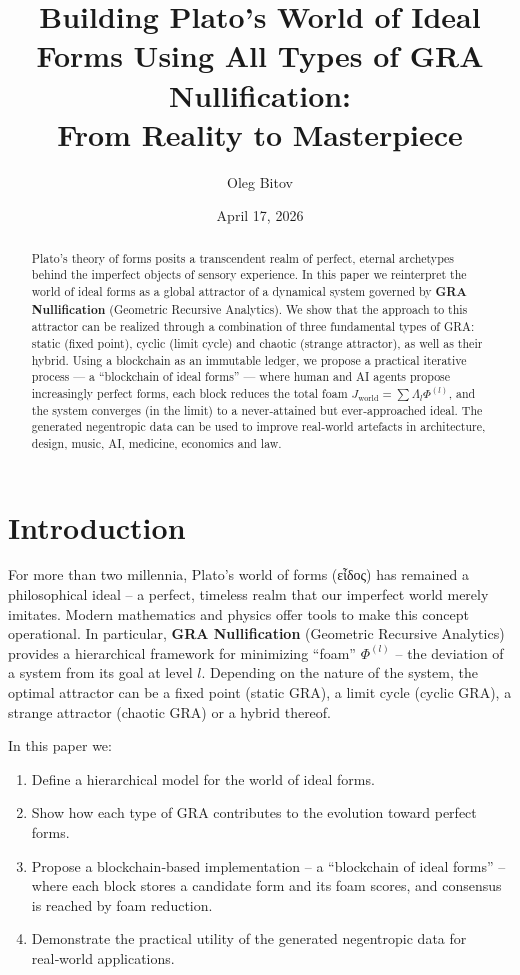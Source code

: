 \documentclass[12pt,a4paper]{article}
\title{Building Plato's World of Ideal Forms Using All Types of GRA Nullification: \\ From Reality to Masterpiece}
\author{Oleg Bitov}
\date{April 17, 2026}
\begin{document}
\maketitle

\begin{abstract}
Plato’s theory of forms posits a transcendent realm of perfect, eternal archetypes behind the imperfect objects of sensory experience. In this paper we reinterpret the world of ideal forms as a global attractor of a dynamical system governed by \textbf{GRA Nullification} (Geometric Recursive Analytics). We show that the approach to this attractor can be realized through a combination of three fundamental types of GRA: static (fixed point), cyclic (limit cycle) and chaotic (strange attractor), as well as their hybrid. Using a blockchain as an immutable ledger, we propose a practical iterative process — a “blockchain of ideal forms” — where human and AI agents propose increasingly perfect forms, each block reduces the total foam \(J_{\text{world}} = \sum \Lambda_l \Phi^{(l)}\), and the system converges (in the limit) to a never‑attained but ever‑approached ideal. The generated negentropic data can be used to improve real‑world artefacts in architecture, design, music, AI, medicine, economics and law.
\end{abstract}

\section{Introduction}

For more than two millennia, Plato’s world of forms (εἶδος) has remained a philosophical ideal – a perfect, timeless realm that our imperfect world merely imitates. Modern mathematics and physics offer tools to make this concept operational. In particular, \textbf{GRA Nullification} (Geometric Recursive Analytics) provides a hierarchical framework for minimizing “foam” \(\Phi^{(l)}\) – the deviation of a system from its goal at level \(l\). Depending on the nature of the system, the optimal attractor can be a fixed point (static GRA), a limit cycle (cyclic GRA), a strange attractor (chaotic GRA) or a hybrid thereof.

In this paper we:

\begin{enumerate}
    \item Define a hierarchical model for the world of ideal forms.
    \item Show how each type of GRA contributes to the evolution toward perfect forms.
    \item Propose a blockchain‑based implementation – a “blockchain of ideal forms” – where each block stores a candidate form and its foam scores, and consensus is reached by foam reduction.
    \item Demonstrate the practical utility of the generated negentropic data for real‑world applications.
\end{enumerate}
\end{document}
